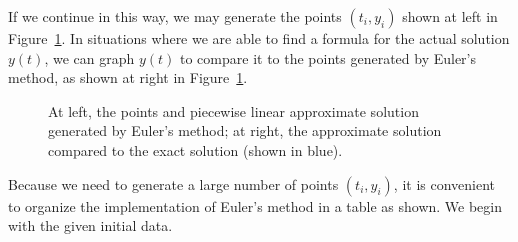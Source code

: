 If we continue in this way, we may generate the points $(t_i, y_i)$
shown at left in Figure~\ref{F:7.3.EulerPts}.  In situations where we are able to find a formula for the actual solution $y(t)$, we can graph $y(t)$ to compare it to the points generated by Euler's method, as shown at right in Figure~\ref{F:7.3.EulerPts}.
\begin{figure}[h]
\begin{center}
  \hspace{0.25in}
\end{center}
\caption{At left, the points and piecewise linear approximate solution generated by Euler's method; at right, the approximate solution compared to the exact solution (shown in blue).} \label{F:7.3.EulerPts}
\end{figure}


Because we need to generate a large number of points $(t_i,y_i)$, it is convenient to organize the implementation of Euler's method in a
table as shown.  We begin with the given initial data.

